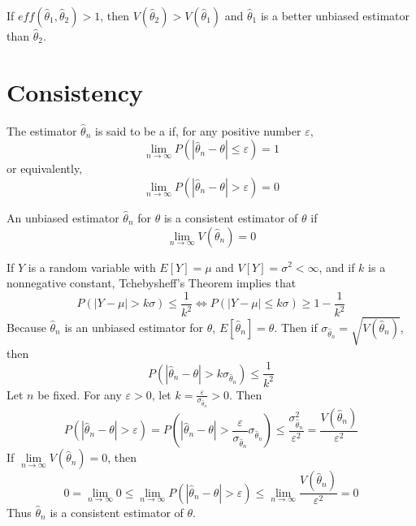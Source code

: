\documentclass[12pt, a4paper, twoside, openright, titlepage]{book}
\begin{document}
If $eff(\hat{\theta}_1,\hat{\theta}_2) > 1$, then $V(\hat{\theta}_2) > V(\hat{\theta}_1)$ and $\hat{\theta}_1$ is a better unbiased estimator than $\hat{\theta}_2$. 


\section{\textsection Consistency}

\begin{defn}{}{}
    The estimator $\hat{\theta}_n$ is said to be a  if, for any positive number $\varepsilon$, \begin{equation*}
        \lim\limits_{n\rightarrow \infty}P(|\hat{\theta}_n-\theta| \leq \varepsilon) = 1
    \end{equation*}
    or equivalently, \begin{equation*}
        \lim\limits_{n\rightarrow \infty}P(|\hat{\theta}_n - \theta| > \varepsilon) = 0
    \end{equation*}
\end{defn}


\begin{thm}{}{}
    An unbiased estimator $\hat{\theta}_n$ for $\theta$ is a consistent estimator of $\theta$ if \begin{equation*}
        \lim\limits_{n\rightarrow \infty}V(\hat{\theta}_n) = 0
    \end{equation*}
\end{thm}
\begin{proof*}{}{}
    If $Y$ is a random variable with $E[Y] = \mu$ and $V[Y] = \sigma^2 < \infty$, and if $k$ is a nonnegative constant, Tchebysheff's Theorem implies that \begin{equation*}
        P(|Y-\mu| > k\sigma) \leq \frac{1}{k^2} \iff P(|Y-\mu|\leq k\sigma) \geq 1 - \frac{1}{k^2}
    \end{equation*}
    Because $\hat{\theta}_n$ is an unbiased estimator for $\theta$, $E[\hat{\theta}_n] = \theta$. Then if $\sigma_{\hat{\theta}_n} = \sqrt{V(\hat{\theta}_n)}$, then \begin{equation*}
        P(|\hat{\theta}_n-\theta| > k\sigma_{\hat{\theta}_n}) \leq  \frac{1}{k^2}
    \end{equation*}
    Let $n$ be fixed. For any $\varepsilon > 0$, let $k = \frac{\varepsilon}{\sigma_{\hat{\theta}_n}} > 0$. Then \begin{equation*}
        P(|\hat{\theta}_n - \theta| > \varepsilon) = P(|\hat{\theta}_n - \theta| > \frac{\varepsilon}{\sigma_{\hat{\theta}_n}}\sigma_{\hat{\theta}_n}) \leq \frac{\sigma_{\hat{\theta}_n}^2}{\varepsilon^2} = \frac{V(\hat{\theta}_n)}{\varepsilon^2}
    \end{equation*}
    If $\lim\limits_{n\rightarrow \infty}V(\hat{\theta}_n) = 0$, then \begin{equation*}
        0 = \lim\limits_{n\rightarrow \infty} 0 \leq \lim\limits_{n\rightarrow \infty}P(|\hat{\theta}_n-\theta| > \varepsilon) \leq \lim\limits_{n\rightarrow \infty}\frac{V(\hat{\theta}_n)}{\varepsilon^2} = 0
    \end{equation*}
    Thus $\hat{\theta}_n$ is a consistent estimator of $\theta$.
\end{proof*}
\end{document}

